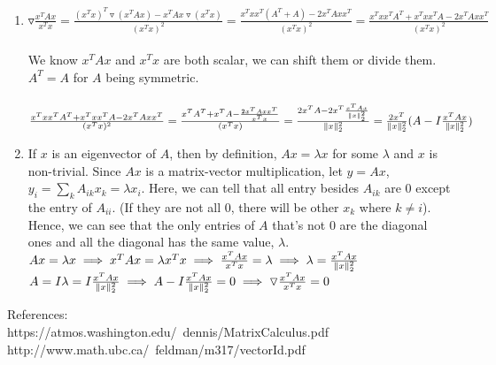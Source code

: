 \documentclass[11pt]{article}
\begin{document}
\begin{solution}
\begin{enumerate}
        \item $\triangledown \frac{x^TAx}{x^Tx} = \frac{(x^Tx)^T \triangledown (x^TAx) - x^TAx \triangledown (x^Tx)}{(x^Tx)^2} = \frac{x^Txx^T(A^T+A) - 2x^TAxx^T}{(x^Tx)^2} = \frac{x^Txx^TA^T + x^Txx^TA - 2x^TAxx^T}{(x^Tx)^2}$\\
        \\
        We know $x^TAx$ and $x^Tx$ are both scalar, we can shift them or divide them. $A^T = A$ for $A$ being symmetric. \\
        \\
        $\frac{x^Txx^TA^T + x^Txx^TA - 2x^TAxx^T}{(x^Tx)^2} = \frac{x^TA^T + x^TA - \frac{2x^TAxx^T}{x^Tx}}{(x^Tx)} = \frac{2x^TA  - 2x^T\frac{x^TAx}{\mathopen\| x \mathclose\|_2^2}}{\mathopen\| x \mathclose\|_2^2} = \frac{2x^T}{\mathopen\| x \mathclose\|_2^2}(A - I\frac{x^TAx}{\mathopen\| x \mathclose\|_2^2})$
        \item If $x$ is an eigenvector of $A$, then by definition, $Ax = \lambda x$ for some $\lambda$ and $x$ is non-trivial. Since $Ax$ is a matrix-vector multiplication, let $y = Ax$, $y_i = \sum_k A_{ik}x_k = \lambda x_i$. Here, we can tell that all entry besides $A_{ik}$ are $0$ except the entry of $A_{ii}$. (If they are not all $0$, there will be other $x_k$ where $k \neq i$). Hence, we can see that the only entries of $A$ that's not $0$ are the diagonal ones and all the diagonal has the same value, $\lambda$.\\
        $Ax = \lambda x \implies x^TAx = \lambda x^Tx \implies \frac{x^TAx}{x^Tx} = \lambda \implies \lambda = \frac{x^TAx}{\mathopen\| x \mathclose\|_2^2}$\\
        $A = I\lambda = I\frac{x^TAx}{\mathopen\| x \mathclose\|_2^2} \implies A - I\frac{x^TAx}{\mathopen\| x \mathclose\|_2^2} = 0 \implies \triangledown \frac{x^TAx}{x^Tx} = 0$
    \end{enumerate}
\end{solution}
References: \\ 
https://atmos.washington.edu/~dennis/MatrixCalculus.pdf \\
http://www.math.ubc.ca/~feldman/m317/vectorId.pdf
\end{document}
